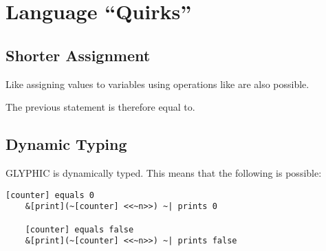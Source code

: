 
\section{Language \enquote{Quirks}}
\subsection{Shorter Assignment}
Like assigning values to variables using  operations like  are also possible.

The previous statement is therefore equal to.

\subsection{Dynamic Typing}
GLYPHIC is dynamically typed. This means that the following is possible:

\begin{Verbatim}[commandchars=none, frame=single]
    [counter] equals 0
    &[print](~[counter] <<~n>>) ~| prints 0

    [counter] equals false
    &[print](~[counter] <<~n>>) ~| prints false
\end{Verbatim}
